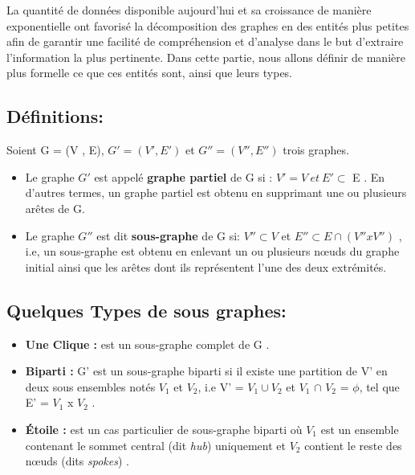 
	La quantité de données disponible aujourd'hui et sa croissance de manière exponentielle ont favorisé la décomposition des graphes en des entités plus petites afin de garantir une facilité de compréhension et d'analyse dans le but d'extraire l'information la plus pertinente. Dans cette partie, nous allons définir de manière plus formelle ce que ces entités sont, ainsi que leurs types.
	
		
		
		
		\subsection{Définitions:}
		Soient G = (V , E), $G' = (V' , E')$ et $G'' = (V'' , E'')$ trois graphes.
		\begin{itemize}[label=$\circ$]
		
			\item Le graphe $G'$ est appelé \textbf{graphe partiel} de G si : $V' = V\ et\ E' \subset$ E \citep{DUT}. En d'autres termes, un graphe partiel est obtenu en supprimant une ou plusieurs arêtes de G.
				

			\item Le graphe $G''$ est dit \textbf{sous-graphe} de G si: $V''\subset V$ et 
			 $E''\subset E \cap (V'' x V'')$ \citep{bac}, i.e, un sous-graphe est obtenu en enlevant un ou plusieurs nœuds du graphe initial ainsi que les arêtes dont ils représentent l'une des deux extrémités.
			 
		\end{itemize}
		
		\subsection{Quelques Types de sous graphes:}
		
		\begin{itemize} [label = $\bullet$]
		
		
			\item \textbf{Une Clique :} est un sous-graphe complet de G \citep{bac}.
			
			\item \textbf{Biparti :} G' est un sous-graphe biparti si il existe une partition de V' en deux sous ensembles notés $V_{1}$ et $V_{2}$, i.e V' = $V_{1} \cup V_{2}$ et $V_{1}$ $\cap$ $V_{2}$ = $\phi$, tel que E' = $V_{1}$ x $V_{2}$ \citep{bac}.
			
			\item \textbf{Étoile :}
			 est un cas particulier de sous-graphe biparti où $V_{1}$ est un ensemble contenant le sommet central (dit \textit{hub}) uniquement et $V_{2}$ contient le reste des nœuds  (dits \textit{spokes})\citep{koutra2015summarizing} .
			 
		
			 
		\end{itemize}